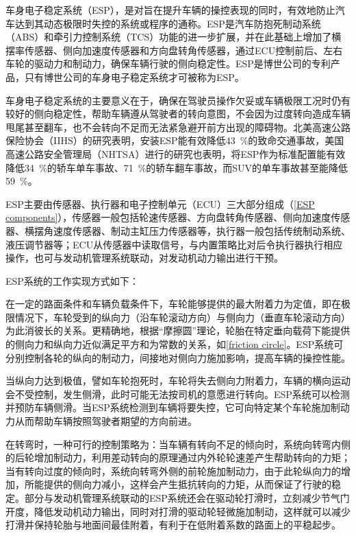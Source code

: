 \documentclass[UTF8]{ctexart}
\numberwithin{figure}{section}
\numberwithin{table}{section}
\begin{document}
车身电子稳定系统（ESP），是对旨在提升车辆的操控表现的同时，有效地防止汽车达到其动态极限时失控的系统或程序的通称。ESP是汽车防抱死制动系统（ABS）和牵引力控制系统（TCS）功能的进一步扩展，并在此基础上增加了横摆率传感器、侧向加速度传感器和方向盘转角传感器，通过ECU控制前后、左右车轮的驱动力和制动力，确保车辆行驶的侧向稳定性。ESP是博世公司的专利产品，只有博世公司的车身电子稳定系统才可被称为ESP。

车身电子稳定系统的主要意义在于，确保在驾驶员操作欠妥或车辆极限工况时仍有较好的侧向稳定性，帮助车辆遵从驾驶者的转向意图，不会因为过度转向造成车辆甩尾甚至翻车，也不会转向不足而无法紧急避开前方出现的障碍物。北美高速公路保险协会（IIHS）的研究表明，安装ESP能有效降低\SI{43}{\percent}的致命交通事故，美国高速公路安全管理局（NHTSA）进行的研究也表明，将ESP作为标准配置能有效降低\SI{34}{\percent}的轿车单车事故、\SI{71}{\percent}的轿车翻车事故，而SUV的单车事故甚至能降低\SI{59}{\percent}。

ESP主要由传感器、执行器和电子控制单元（ECU）三大部分组成（\cref{ESP components}），传感器一般包括轮速传感器、方向盘转角传感器、侧向加速度传感器、横摆角速度传感器、制动主缸压力传感器等，执行器一般包括传统制动系统、液压调节器等；ECU从传感器中读取信号，与内置策略比对后令执行器执行相应操作，也可与发动机管理系统联动，对发动机动力输出进行干预。

ESP系统的工作实现方式如下：

在一定的路面条件和车辆负载条件下，车轮能够提供的最大附着力为定值，即在极限情况下，车轮受到的纵向力（沿车轮滚动方向）与侧向力（垂直车轮滚动方向）为此消彼长的关系。更精确地，根据“摩擦圆”理论，轮胎在特定垂向载荷下能提供的侧向力和纵向力近似满足平方和为常数的关系，如\cref{friction circle}。ESP系统可分别控制各轮的纵向的制动力，间接地对侧向力施加影响，提高车辆的操控性能。

当纵向力达到极值，譬如车轮抱死时，车轮将失去侧向力附着力，车辆的横向运动会不受控制，发生侧滑，此时可能无法按司机的意愿进行转向。ESP系统可以检测并预防车辆侧滑。当ESP系统检测到车辆将要失控，它可向特定某个车轮施加制动力从而帮助车辆按照驾驶者期望的方向前进。

在转弯时，一种可行的控制策略为：当车辆有转向不足的倾向时，系统向转弯内侧的后轮增加制动力，利用差动转向的原理通过内外轮轮速差产生帮助转向的力矩；当有转向过度的倾向时，系统向转弯外侧的前轮施加制动力，由于此轮纵向力的增加，所能提供的侧向力减小，这样会产生抵抗转向的力矩，从而保证了行驶的稳定。部分与发动机管理系统联动的ESP系统还会在驱动轮打滑时，立刻减少节气门开度，降低发动机动力输出，同时对打滑的驱动轮轻微施加制动，这样就可以减少打滑并保持轮胎与地面间最佳附着，有利于在低附着系数的路面上的平稳起步。
\end{document}
